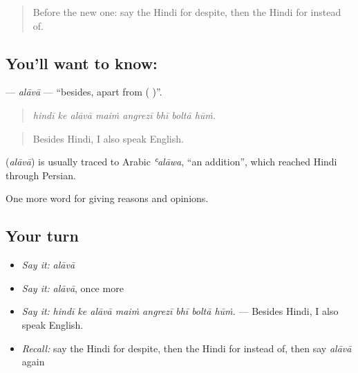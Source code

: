 \label{lesson:HI-C371-alava}



\begin{quote}
Before the new one: say the Hindi for despite, then the Hindi for instead of.
\end{quote}

\subsection*{You'll want to know: }
\textbf{} — \emph{alāvā} — \textquotedblleft{}besides, apart from ( )\textquotedblright{}.

\begin{quote}
       
\end{quote}

\begin{quote}
\emph{hindī ke alāvā maiṁ angrezī bhī boltā hūṁ.}
\end{quote}

\begin{quote}
Besides Hindi, I also speak English.
\end{quote}

\begin{cousinweb}
\textbf{} (\emph{alāvā}) is usually traced to Arabic \emph{ʿalāwa}, \textquotedblleft{}an addition\textquotedblright{}, which reached Hindi through Persian.
\end{cousinweb}

\begin{grammarlens}[title={What you've built}]
One more word for giving reasons and opinions.
\end{grammarlens}

\subsection*{Your turn}
\begin{itemize}
\raggedright
  \item \emph{Say it:} \emph{alāvā}
  \item \emph{Say it:} \emph{alāvā}, once more
  \item \emph{Say it:} \emph{hindī ke alāvā maiṁ angrezī bhī boltā hūṁ.} — Besides Hindi, I also speak English.
  \item \emph{Recall:} say the Hindi for despite, then the Hindi for instead of, then say \emph{alāvā} again
\end{itemize}

